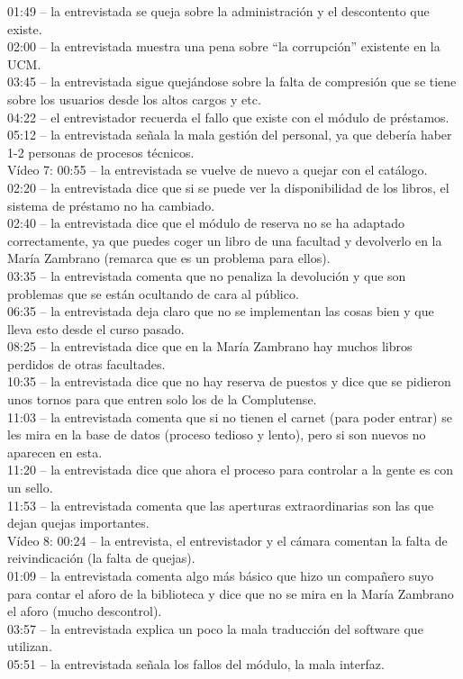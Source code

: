 \documentclass[12pt]{article}
\begin{document}
01:49 – la entrevistada se queja sobre la administración y el descontento que existe.\\
02:00 – la entrevistada muestra una pena sobre “la corrupción” existente en la UCM.\\
03:45 – la entrevistada sigue quejándose sobre la falta de compresión que se tiene sobre los usuarios desde los altos cargos y etc.\\
04:22 – el entrevistador recuerda el fallo que existe con el módulo de préstamos.\\
05:12 – la entrevistada señala la mala gestión del personal, ya que debería haber 1-2 personas de procesos técnicos.\\
Vídeo 7: 
00:55 – la entrevistada se vuelve de nuevo a quejar con el catálogo.\\
02:20 – la entrevistada dice que si se puede ver la disponibilidad de los libros, el sistema de préstamo no ha cambiado.\\
02:40 – la entrevistada dice que el módulo de reserva no se ha adaptado correctamente, ya que puedes coger un libro de una facultad y devolverlo en la María Zambrano (remarca que es un problema para ellos).\\
03:35 – la entrevistada comenta que no penaliza la devolución y que son problemas que se están ocultando de cara al público.\\
06:35 – la entrevistada deja claro que no se implementan las cosas bien y que lleva esto desde el curso pasado.\\
08:25 – la entrevistada dice que en la María Zambrano hay muchos libros perdidos de otras facultades.\\
10:35 – la entrevistada dice que no hay reserva de puestos y dice que se pidieron unos tornos para que entren solo los de la Complutense.\\
11:03 – la entrevistada comenta que si no tienen el carnet (para poder entrar) se les mira en la base de datos (proceso tedioso y lento), pero si son nuevos no aparecen en esta.\\
11:20 – la entrevistada dice que ahora el proceso para controlar a la gente es con un sello.\\
11:53 – la entrevistada comenta que las aperturas extraordinarias son las que dejan quejas importantes.\\
Vídeo 8:
00:24 – la entrevista, el entrevistador y el cámara comentan la falta de reivindicación (la falta de quejas).\\
01:09 – la entrevistada comenta algo más básico que hizo un compañero suyo para contar el aforo de la biblioteca y dice que no se mira en la María Zambrano el aforo (mucho descontrol).\\
03:57 – la entrevistada explica un poco la mala traducción del software que utilizan.\\
05:51 – la entrevistada señala los fallos del módulo, la mala interfaz.\\
\end{document}
